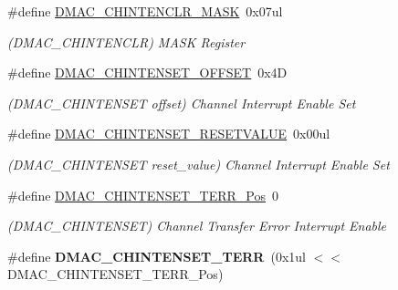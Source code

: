 \begin{DoxyCompactItemize}
\item 
\hypertarget{group___s_a_m_l21___d_m_a_c_gae9833cc4e1206d0cd3c19e358f20a466}{}\#define \hyperlink{group___s_a_m_l21___d_m_a_c_gae9833cc4e1206d0cd3c19e358f20a466}{D\+M\+A\+C\+\_\+\+C\+H\+I\+N\+T\+E\+N\+C\+L\+R\+\_\+\+M\+A\+S\+K}~0x07ul\label{group___s_a_m_l21___d_m_a_c_gae9833cc4e1206d0cd3c19e358f20a466}

\begin{DoxyCompactList}\small\item\em (D\+M\+A\+C\+\_\+\+C\+H\+I\+N\+T\+E\+N\+C\+L\+R) M\+A\+S\+K Register \end{DoxyCompactList}\item 
\hypertarget{group___s_a_m_l21___d_m_a_c_gafbd220229d3795fb078897b234f8e027}{}\#define \hyperlink{group___s_a_m_l21___d_m_a_c_gafbd220229d3795fb078897b234f8e027}{D\+M\+A\+C\+\_\+\+C\+H\+I\+N\+T\+E\+N\+S\+E\+T\+\_\+\+O\+F\+F\+S\+E\+T}~0x4\+D\label{group___s_a_m_l21___d_m_a_c_gafbd220229d3795fb078897b234f8e027}

\begin{DoxyCompactList}\small\item\em (D\+M\+A\+C\+\_\+\+C\+H\+I\+N\+T\+E\+N\+S\+E\+T offset) Channel Interrupt Enable Set \end{DoxyCompactList}\item 
\hypertarget{group___s_a_m_l21___d_m_a_c_gaba46207ae255c748092249821a830cd2}{}\#define \hyperlink{group___s_a_m_l21___d_m_a_c_gaba46207ae255c748092249821a830cd2}{D\+M\+A\+C\+\_\+\+C\+H\+I\+N\+T\+E\+N\+S\+E\+T\+\_\+\+R\+E\+S\+E\+T\+V\+A\+L\+U\+E}~0x00ul\label{group___s_a_m_l21___d_m_a_c_gaba46207ae255c748092249821a830cd2}

\begin{DoxyCompactList}\small\item\em (D\+M\+A\+C\+\_\+\+C\+H\+I\+N\+T\+E\+N\+S\+E\+T reset\+\_\+value) Channel Interrupt Enable Set \end{DoxyCompactList}\item 
\hypertarget{group___s_a_m_l21___d_m_a_c_gadf63ae04334a6a887c211353e7291987}{}\#define \hyperlink{group___s_a_m_l21___d_m_a_c_gadf63ae04334a6a887c211353e7291987}{D\+M\+A\+C\+\_\+\+C\+H\+I\+N\+T\+E\+N\+S\+E\+T\+\_\+\+T\+E\+R\+R\+\_\+\+Pos}~0\label{group___s_a_m_l21___d_m_a_c_gadf63ae04334a6a887c211353e7291987}

\begin{DoxyCompactList}\small\item\em (D\+M\+A\+C\+\_\+\+C\+H\+I\+N\+T\+E\+N\+S\+E\+T) Channel Transfer Error Interrupt Enable \end{DoxyCompactList}\item 
\hypertarget{group___s_a_m_l21___d_m_a_c_ga9cef56a501eaa0f6d73e79a30a2123ab}{}\#define {\bfseries D\+M\+A\+C\+\_\+\+C\+H\+I\+N\+T\+E\+N\+S\+E\+T\+\_\+\+T\+E\+R\+R}~(0x1ul $<$$<$ D\+M\+A\+C\+\_\+\+C\+H\+I\+N\+T\+E\+N\+S\+E\+T\+\_\+\+T\+E\+R\+R\+\_\+\+Pos)\label{group___s_a_m_l21___d_m_a_c_ga9cef56a501eaa0f6d73e79a30a2123ab}


\end{DoxyCompactItemize}

